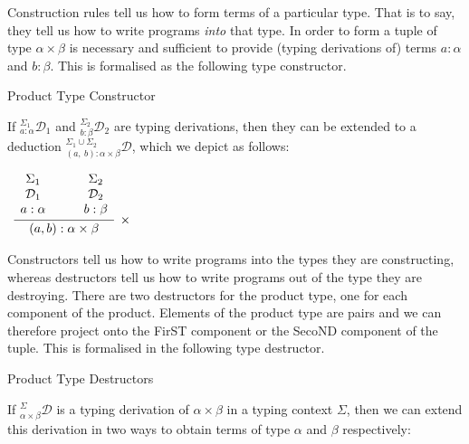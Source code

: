 \documentclass{book}
\begin{document}
        Construction rules tell us how to form terms of a particular type. That is to say, they tell us how to write programs \emph{into} that type. In order to form a tuple of type $\alpha \times \beta$ is necessary and sufficient to provide (typing derivations of) terms $a : \alpha$ and $b : \beta$. This is formalised as the following type constructor.

        {Product Type Constructor}

            If $^{\Sigma_{1}}_{a : \alpha}\mathcal{D}_{1}$ and $^{\Sigma_{2}}_{b : \beta}\mathcal{D}_{2}$ are typing derivations, then they can be extended to a deduction $^{\Sigma_{1}\cup \Sigma_{2}}_{(a, \ b) : \alpha \times \beta}\mathcal{D}$, which we depict as follows: 

            \begin{center}
                $\begin{array}{c}		
                    \infer[\times]{(a, b) : \alpha \times \beta}{\begin{array}{c} \Sigma_{1} \\ \mathcal{D}_{1} \\ a : \alpha \end{array} \quad & \begin{array}{c} \Sigma_{2} \\ \mathcal{D}_{2} \\  b : \beta \end{array}}	
                \end{array}$
            \end{center}
        

        Constructors tell us how to write programs into the types they are constructing, whereas destructors tell us how to write programs out of the type they are destroying. There are two destructors for the product type, one for each component of the product. Elements of the product type are pairs and we can therefore project onto the FirST component or the SecoND component of the tuple. This is formalised in the following type destructor. 

        {Product Type Destructors}
    
            If $^{\Sigma}_{\alpha \times \beta}\mathcal{D}$ is a typing derivation of $\alpha \times \beta$ in a typing context $\Sigma$, then we can extend this derivation in two ways to obtain terms of type $\alpha$ and $\beta$ respectively: 
    
\end{document}
